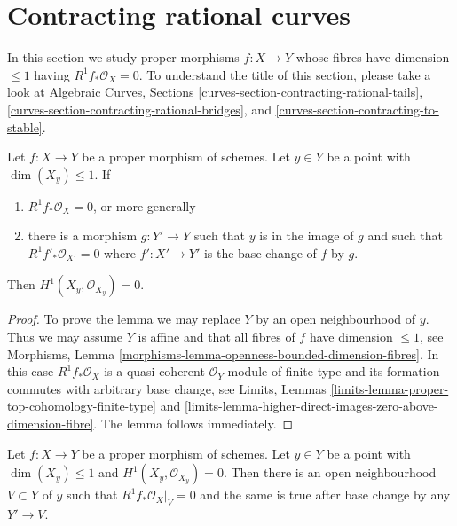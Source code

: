 \section{Contracting rational curves}
\label{section-contracting}

\noindent
In this section we study proper morphisms $f : X \to Y$ whose fibres
have dimension $\leq 1$ having $R^1f_*\mathcal{O}_X = 0$.
To understand the title of this section, please take a look at
Algebraic Curves, Sections
\ref{curves-section-contracting-rational-tails},
\ref{curves-section-contracting-rational-bridges}, and
\ref{curves-section-contracting-to-stable}.

\begin{lemma}
\label{lemma-check-h1-fibre-zero}
Let $f : X \to Y$ be a proper morphism of schemes. Let $y \in Y$
be a point with $\dim(X_y) \leq 1$. If
\begin{enumerate}
\item $R^1f_*\mathcal{O}_X = 0$, or more generally
\item there is a morphism $g : Y' \to Y$ such that $y$ is in the image
of $g$ and such that $R^1f'_*\mathcal{O}_{X'} = 0$ where $f' : X' \to Y'$
is the base change of $f$ by $g$.
\end{enumerate}
Then $H^1(X_y, \mathcal{O}_{X_y}) = 0$.
\end{lemma}

\begin{proof}
To prove the lemma we may replace $Y$ by an open neighbourhood of $y$.
Thus we may assume $Y$ is affine
and that all fibres of $f$ have dimension $\leq 1$, see
Morphisms, Lemma \ref{morphisms-lemma-openness-bounded-dimension-fibres}.
In this case $R^1f_*\mathcal{O}_X$ is a quasi-coherent $\mathcal{O}_Y$-module
of finite type and its formation commutes with arbitrary base change, see
Limits, Lemmas \ref{limits-lemma-proper-top-cohomology-finite-type} and
\ref{limits-lemma-higher-direct-images-zero-above-dimension-fibre}.
The lemma follows immediately.
\end{proof}

\begin{lemma}
\label{lemma-h1-fibre-zero}
Let $f : X \to Y$ be a proper morphism of schemes. Let $y \in Y$
be a point with $\dim(X_y) \leq 1$ and $H^1(X_y, \mathcal{O}_{X_y}) = 0$.
Then there is an open neighbourhood $V \subset Y$ of $y$ such that
$R^1f_*\mathcal{O}_X|_V = 0$
and the same is true after base change by any $Y' \to V$.
\end{lemma}

